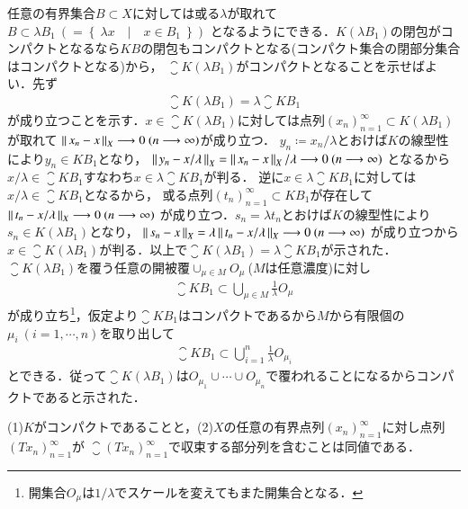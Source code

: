 	\begin{prf}
		任意の有界集合$B \subset X$に対しては或る$\lambda$が取れて$B \subset \lambda B_1\ (= \left\{\ \lambda x\quad |\quad x \in B_1\ \right\})$
		となるようにできる．$K(\lambda B_1)$の閉包がコンパクトとなるなら$KB$の閉包もコンパクトとなる(コンパクト集合の閉部分集合はコンパクトとなる)から，
		$\closure{K(\lambda B_1)}$がコンパクトとなることを示せばよい．先ず
		\begin{align}
			\closure{K(\lambda B_1)} = \lambda \closure{KB_1}
		\end{align}
		が成り立つことを示す．$x \in \closure{K(\lambda B_1)}$に対しては点列$(x_n)_{n=1}^{\infty} \subset K(\lambda B_1)$が取れて
		$\left\|\, x_n - x\, \right\|_{X} \longrightarrow 0\ (n \longrightarrow \infty)$が成り立つ．
		$y_n \coloneqq x_n/\lambda$とおけば$K$の線型性により$y_n \in KB_1$となり，
		$\left\|\, y_n - x/\lambda\, \right\|_{X}= \left\|\, x_n - x\, \right\|_{X}/\lambda \longrightarrow 0\ (n \longrightarrow \infty)$
		となるから$x/\lambda \in \closure{KB_1}$すなわち$x \in \lambda\closure{KB_1}$が判る．
		逆に$x \in \lambda \closure{KB_1}$に対しては$x/\lambda \in \closure{KB_1}$となるから，
		或る点列$(t_n)_{n=1}^{\infty} \subset KB_1$が存在して$\left\|\, t_n - x/\lambda\, \right\|_{X} \longrightarrow 0\ (n \longrightarrow \infty)$
		が成り立つ．$s_n = \lambda t_n$とおけば$K$の線型性により$s_n \in K(\lambda B_1)$となり，
		$\left\|\, s_n - x\, \right\|_{X}= \lambda \left\|\, t_n - x/\lambda\, \right\|_{X} \longrightarrow 0\ (n \longrightarrow \infty)$
		が成り立つから$x \in \closure{K(\lambda B_1)}$が判る．以上で$\closure{K(\lambda B_1)} = \lambda \closure{KB_1}$が示された．
		$\closure{K(\lambda B_1)}$を覆う任意の開被覆$\cup_{\mu \in M}O_\mu\ $($M$は任意濃度)に対し
		\begin{align}
			\closure{KB_1} \subset \bigcup_{\mu \in M} \tfrac{1}{\lambda}O_\mu
		\end{align}
		が成り立ち\footnote{開集合$O_\mu$は$1/\lambda$でスケールを変えてもまた開集合となる．}，仮定より$\closure{KB_1}$はコンパクトであるから$M$から有限個の$\mu_i\ (i=1,\cdots,n)$を取り出して
		\begin{align}
			\closure{KB_1} \subset \bigcup_{i=1}^{n} \tfrac{1}{\lambda}O_{\mu_i}
		\end{align}
		とできる．従って$\closure{K(\lambda B_1)}$は$O_{\mu_1}\cup \cdots \cup O_{\mu_n}$で覆われることになるからコンパクトであると示された．
		\QED
	\end{prf}
	
	\begin{itembox}[l]{}
		\begin{lem}[コンパクト作用素であることの同値条件]
			(1)$K$がコンパクトであることと，(2)$X$の任意の有界点列$(x_n)_{n=1}^{\infty}$に対し点列$(Tx_n)_{n=1}^{\infty}$が
				$\closure{(Tx_n)_{n=1}^{\infty}}$で収束する部分列を含むことは同値である．
				\label{lem:compact_operator_equiv_cond}
		\end{lem}
	\end{itembox}
	
